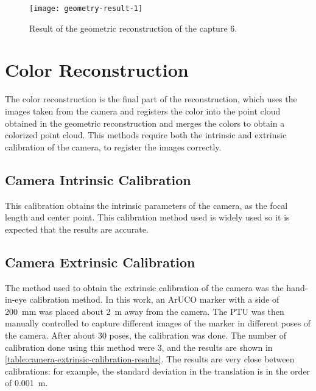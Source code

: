 \begin{figure}[h]

    \centering
    \texttt{[image: geometry-result-1]}

    \caption{Result of the geometric reconstruction of the capture 6.}
    \label{figure:results-capture-6}
    
\end{figure}

\section{Color Reconstruction}

The color reconstruction is the final part of the reconstruction, which uses the images taken from the camera and registers the color into the point cloud obtained in the geometric reconstruction and merges the colors to obtain a colorized point cloud. This methods require both the intrinsic and extrinsic calibration of the camera, to register the images correctly. 

\subsection{Camera Intrinsic Calibration}

This calibration obtains the intrinsic parameters of the camera, as the focal length and center point. This calibration method used is widely used so it is expected that the results are accurate. 

\subsection{Camera Extrinsic Calibration}

The method used to obtain the extrinsic calibration of the camera was the hand-in-eye calibration method. In this work, an ArUCO marker with a side of \SI{200}{\milli\meter} was placed about \SI{2}{\meter} away from the camera. The PTU was then manually controlled to capture different images of the marker in different poses of the camera. After about 30 poses, the calibration was done. The number of calibration done using this method were 3, and the results are shown in \cref{table:camera-extrinsic-calibration-results}. The results are very close between calibrations: for example, the standard deviation in the translation is in the order of \SI{0.001}{\meter}.

